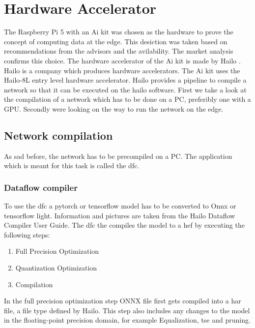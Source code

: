 \chapter{Hardware Accelerator}

The Raspberry Pi 5 with an Ai kit was chosen as the hardware to prove the concept of computing data at the edge.
This desiction was taken based on recommendations from the advisors and the avilability.
The market analysis confirms this choice.
The hardware accelerator of the Ai kit is made by Hailo \cite{hailo}.
Hailo is a company which produces hardware accelerators.
The Ai kit uses the Hailo-8L entry level hardware accelerator.
Hailo provides a pipeline to compile a network so that it can be executed on the hailo software.
First we take a look at the compilation of a network which has to be done on a PC, 
preferibly one with a GPU.
Secondly were looking on the way to run the network on the edge.

\section{Network compilation}
As sad before, the network has to be precompiled on a PC.
The application which is meant for this task is called the \Acrfull{dfc}.

\subsection{Dataflow compiler
\label{section:dfc}}

To use the \acrshort{dfc} a pytorch or tensorflow model has to be converted to Onnx or tensorflow light.
Information and pictures are taken from the Hailo Dataflow Compiler User Guide\cite{hailo_dataflow_compiler}.
The \acrshort{dfc} the compiles the model to a \Acrfull{hef} by executing the following steps:

\begin{enumerate}
    \item Full Precision Optimization
    \item Quantization Optimization
    \item Compilation
\end{enumerate}
In the full precision optimization step ONNX file first gets compiled into a \acrfull{har} file, a file type defined by Hailo.
This step also includes any changes to the model in the floating-point precision domain, for example Equalization\cite{meller2019same}, \acrshort{tse}\cite{Vosco_2021_ICCV} and pruning.

